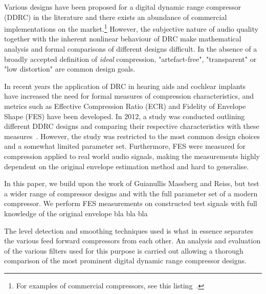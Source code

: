 \documentclass[../main2.tex]{subfiles}
\begin{document}
Various designs have been proposed for a digital dynamic range compressor (DDRC) in the literature and there exists an abundance of commercial implementations on the market.\footnote{For examples of commercial compressors, see this listing~\cite{commercial}.} However, the subjective nature of audio quality together with the inherent nonlinear behaviour of DRC make mathematical analysis and formal comparisons of different designs difficult. In the absence of a broadly accepted definition of \emph{ideal} compression, "artefact-free", "transparent" or "low distortion" are common design goals.

In recent years the application of DRC in hearing aids and cochlear implants have increased the need for formal measures of compression characteristics, and metrics such as Effective Compression Ratio (ECR) and Fidelity of Envelope Shape (FES) have been developed. In 2012, a study was conducted outlining different DDRC designs and comparing their respective characteristics with these measures~\cite{reiss2012tutorial}. However, the study was restricted to the most common design choices and a somewhat limited parameter set. Furthermore, FES were measured for compression applied to real world audio signals, making the measurements highly dependent on the original envelope estimation method and hard to generalise.

In this paper, we build upon the work of Guianullis Massberg and Reiss, but test a wider range of compressor designs and with the full parameter set of a modern compressor. We perform FES measurements on constructed test signals with full knowledge of the original envelope bla bla bla


The level detection and smoothing techniques used is what in essence separates the various feed forward compressors from each other. An analysis and evaluation of the various filters used for this purpose is carried out allowing a thorough comparison of the most prominent digital dynamic range compressor designs. 

\end{document}
